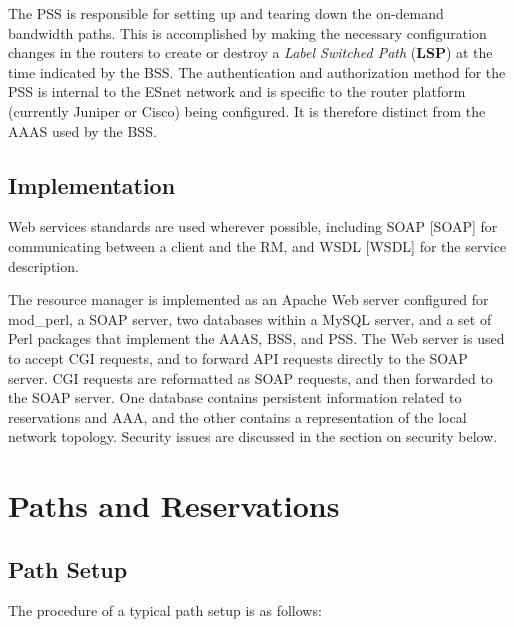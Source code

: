 \documentclass[conference]{IEEEtran}
\begin{document}
The PSS is responsible for setting up and tearing down the on-demand bandwidth 
paths. This is accomplished by making the necessary configuration changes in 
the routers to create or destroy a \emph{Label Switched Path }(\textbf{LSP}) at the time
indicated by the BSS. The authentication and authorization method for the PSS 
is internal to the ESnet network and is specific to the router platform 
(currently Juniper or Cisco) being configured.  It is therefore distinct from 
the AAAS used by the BSS.

\subsection{Implementation}

Web services standards are used wherever possible, including SOAP [SOAP]
for communicating between a client and the RM, and 
WSDL [WSDL] for the service
description. 
 
The resource manager is implemented as an Apache Web server configured for
mod\_perl, a SOAP server, two databases within a MySQL server, and a set of 
Perl packages that implement the AAAS, BSS, and PSS.  The Web server is
used to accept CGI requests, and to forward API requests directly to the SOAP 
server.  CGI requests are reformatted as SOAP requests, and then forwarded to 
the SOAP server.  One database contains persistent information related to
reservations and AAA, and the other contains a representation of the local
network topology.  Security issues are discussed in the section on security
below.

\section{Paths and Reservations}

\subsection{Path Setup}

The procedure of a typical path setup is as follows:
\end{document}
